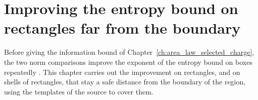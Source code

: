 \chapter{Improving the entropy bound on rectangles far from the boundary}
\label{ch:area_law_safe_boxes}

Before giving the information bound of Chapter~\ref{ch:area_law_selected_charge},
the two norm comparisons improve the exponent of the entropy bound on boxes
repeatedly \cite[Section~9]{OpenAI2026AreaLaw}. This chapter carries out the
improvement on rectangles, and on shells of rectangles, that stay a safe
distance from the boundary of the region, using the templates of the source to
cover them.





















